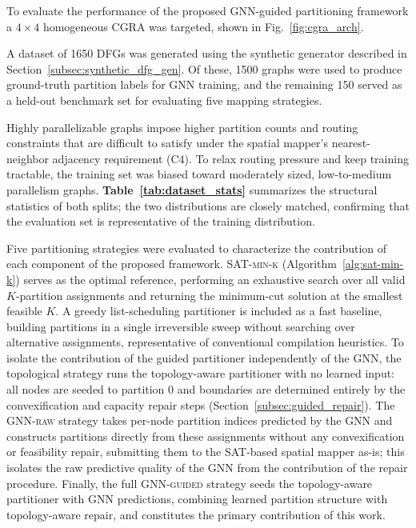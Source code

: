 \documentclass[runningheads]{llncs}
\begin{document}
To evaluate the performance of the proposed GNN-guided partitioning framework a $4\times4$ homogeneous CGRA was targeted, shown in Fig.~\ref{fig:cgra_arch}. 

A dataset of 1650 DFGs was generated using the synthetic generator described in Section~\ref{subsec:synthetic_dfg_gen}. Of these, 1500 graphs were used to produce ground-truth partition labels for GNN training, and the remaining 150 served as a held-out benchmark set for evaluating five mapping strategies. 

Highly parallelizable graphs impose higher partition counts and routing constraints that are difficult to satisfy under the spatial mapper's nearest-neighbor adjacency requirement (C4). To relax routing pressure and keep training tractable, the training set was biased toward moderately sized, low-to-medium parallelism graphs. \textbf{Table~\ref{tab:dataset_stats}} summarizes the structural statistics of both splits; the two distributions are closely matched, confirming that the evaluation set is representative of the training distribution.

Five partitioning strategies were evaluated to characterize the contribution of each component of the proposed framework. \textsc{SAT-min-k} (Algorithm~\ref{alg:sat-min-k}) serves as the optimal reference, performing an exhaustive search over all valid $K$-partition assignments and returning the minimum-cut solution at the smallest feasible $K$. A greedy list-scheduling partitioner is included as a fast baseline, building partitions in a single irreversible sweep without searching over alternative assignments, representative of conventional compilation heuristics. To isolate the contribution of the guided partitioner independently of the GNN, the topological strategy runs the topology-aware partitioner with no learned input: all nodes are seeded to partition $0$ and boundaries are determined entirely by the convexification and capacity repair steps (Section~\ref{subsec:guided_repair}). The \textsc{GNN-raw} strategy takes per-node partition indices predicted by the GNN and constructs partitions directly from these assignments without any convexification or feasibility repair, submitting them to the SAT-based spatial mapper as-is; this isolates the raw predictive quality of the GNN from the contribution of the repair procedure. Finally, the full \textsc{GNN-guided} strategy seeds the topology-aware partitioner with GNN predictions, combining learned partition structure with topology-aware repair, and constitutes the primary contribution of this work.
\end{document}
